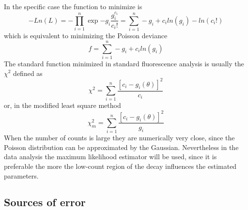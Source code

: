 In the specific case the function to minimize is
\begin{equation}
-Ln(L) = - \prod _{i=1}^{n} \exp{-g_{i}} \frac{g_{i}^{c_i}}{c_{i}!} = \sum _{i=1}^{n} -g_{i} + c_{i}ln(g_{i}) - ln(c_{i}!)
\end{equation}
which is equivalent to minimizing the Poisson deviance\cite{Bajzer1991}
\begin{equation}
f = \sum _{i=1}^{n} -g_{i} + c_{i}ln(g_{i})
\end{equation}
The standard function minimized in standard fluorescence analysis is usually the $\chi ^{2}$ defined as
\begin{equation}
\chi ^{2} = \sum _{i=1}^{n} \frac{\left[ c_{i} - g_{i}(\theta) \right] ^{2}}{c_{i}}
\end{equation}
or, in the modified least square method\cite{Bajzer1991}
\begin{equation}
\chi _{m}^{2} = \sum _{i=1}^{n} \frac{\left[ c_{i} - g_{i}(\theta) \right] ^{2}}{g_{i}}
\end{equation}
When the number of counts is large they are numerically very close, since the Poisson distribution can be approximated by the Gaussian. Nevertheless in the data analysis the maximum likelihood estimator will be used, since it is preferable the more the low-count region of the decay influences the estimated parameters\cite{Bajzer1991}. 

\subsection{Sources of error}

%

%
%


